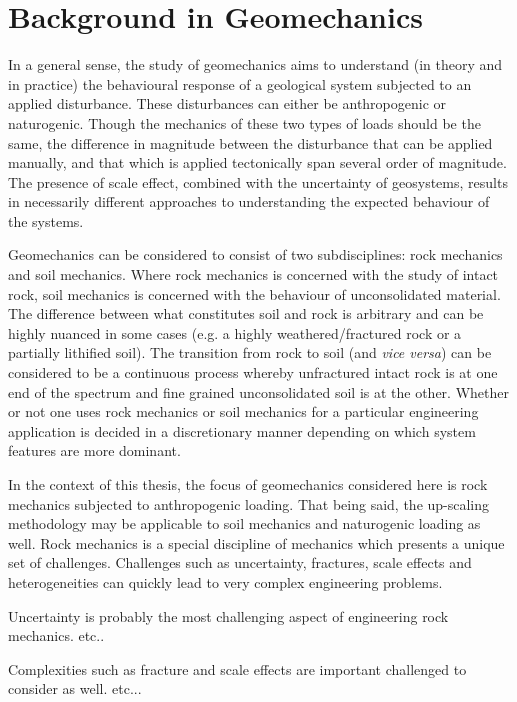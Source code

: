 \chapter{Background in Geomechanics}
In a general sense, the study of geomechanics aims to understand (in theory and in practice) the behavioural response of a geological system subjected to an applied disturbance. These disturbances can either be anthropogenic or naturogenic. Though the mechanics of these two types of loads should be the same, the difference in magnitude between the disturbance that can be applied manually, and that which is applied tectonically span several order of magnitude. The presence of scale effect, combined with the uncertainty of geosystems, results in necessarily different approaches to understanding the expected behaviour of the systems. 

Geomechanics can be considered to consist of two subdisciplines: rock mechanics and soil mechanics. Where rock mechanics is concerned with the study of intact rock, soil mechanics is concerned with the behaviour of unconsolidated material. The difference between what constitutes soil and rock is arbitrary and can be highly nuanced in some cases (e.g. a highly weathered/fractured rock or a partially lithified soil). The transition from rock to soil (and \textit{vice versa}) can be considered to be a continuous process whereby unfractured intact rock is at one end of the spectrum and fine grained unconsolidated soil is at the other. Whether or not one uses rock mechanics or soil mechanics for a particular engineering application is decided in a discretionary manner depending on which system features are more dominant.

In the context of this thesis, the focus of geomechanics considered here is rock mechanics subjected to anthropogenic loading. That being said, the up-scaling methodology may be applicable to soil mechanics and naturogenic loading as well.  
Rock mechanics is a special discipline of mechanics which presents a unique set of challenges. Challenges such as uncertainty, fractures, scale effects and heterogeneities can quickly lead to very complex engineering problems. 

Uncertainty is probably the most challenging aspect of engineering rock mechanics. etc..

Complexities such as fracture and scale effects are important challenged to consider as well. etc...


